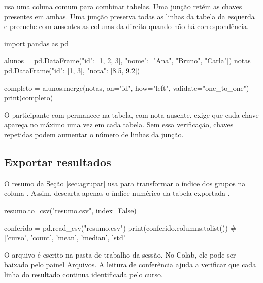  usa uma coluna comum para combinar tabelas. Uma junção  retém as chaves presentes em ambas. Uma junção  preserva todas as linhas da tabela da esquerda e preenche com ausentes as colunas da direita quando não há correspondência.

\begin{exemplo}
import pandas as pd

alunos = pd.DataFrame({"id": [1, 2, 3], "nome": ["Ana", "Bruno", "Carla"]})
notas = pd.DataFrame({"id": [1, 3], "nota": [8.5, 9.2]})

completo = alunos.merge(notas, on="id", how="left",
                        validate="one_to_one")
print(completo)
\end{exemplo}

O participante com  permanece na tabela, com nota ausente.  exige que cada chave apareça no máximo uma vez em cada tabela. Sem essa verificação, chaves repetidas podem aumentar o número de linhas da junção.

\subsection{Exportar resultados}

O resumo da Seção \ref{sec:agrupar} usa  para transformar o índice dos grupos na coluna . Assim,  descarta apenas o índice numérico da tabela exportada \cite{pandas}.

\begin{exemplo}
resumo.to_csv("resumo.csv", index=False)

conferido = pd.read_csv("resumo.csv")
print(conferido.columns.tolist())
# ['curso', 'count', 'mean', 'median', 'std']
\end{exemplo}

O arquivo é escrito na pasta de trabalho da sessão. No Colab, ele pode ser baixado pelo painel Arquivos. A leitura de conferência ajuda a verificar que cada linha do resultado continua identificada pelo curso.
